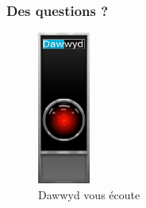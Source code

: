 \documentclass{beamer}
\begin{document}
\begin{frame}
	\frametitle{Des questions ?}
	\centering
	\begin{figure}
	\includegraphics[height=5cm]{hal_dawwyd}
	\caption{Dawwyd vous écoute}
	\end{figure}
\end{frame}
\end{document}

